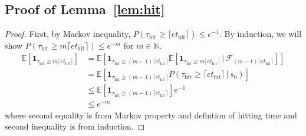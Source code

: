 \documentclass{article}
\theoremstyle{definition}
\theoremstyle{remark}
\newcommand{\expec}{\mathbb{E}}
\newcommand{\cF}{\mathcal{F}}
\begin{document}
\subsection{Proof of Lemma~\ref{lem:hit}}
\begin{proof}
    First, by Markov inequality, $P(\tau_{\mathrm{hit}} \ge \lceil e t_{\mathrm{hit}}\rceil) \le e^{-1}$. By induction, we will show $P(\tau_{\mathrm{hit}} \ge m\lceil e t_{\mathrm{hit}}\rceil) \le e^{-m}$ for $m \in \mathbb{N}$. 
    \begin{align*}       \expec[\mathbf{1}_{\tau_{\mathrm{hit}} \ge m\lceil e t_{\mathrm{hit}}\rceil}]&=\expec[\mathbf{1}_{\tau_{\mathrm{hit}} \ge (m-1)\lceil e t_{\mathrm{hit}}\rceil} \expec  [\mathbf{1}_{\tau_{\mathrm{hit}} \ge m\lceil e t_{\mathrm{hit}}\rceil} \,|\, \cF_{(m-1)\lceil e t_{\mathrm{hit}}\rceil}] ]
    \\&=\expec[\mathbf{1}_{\tau_{\mathrm{hit}} \ge (m-1)\lceil e t_{\mathrm{hit}}\rceil} P(\tau_{\mathrm{hit}} \ge \lceil e t_{\mathrm{hit}}\rceil \,|\, s_0) ]
    \\& \le \expec[\mathbf{1}_{\tau_{\mathrm{hit}} \ge (m-1)\lceil e t_{\mathrm{hit}}\rceil}]e^{-1}
    \\& \le e^{-m}
    \end{align*}
    where second equality is from Markov property and defintion of hitting time and second inequality is from induction.
\end{proof}
\end{document}
